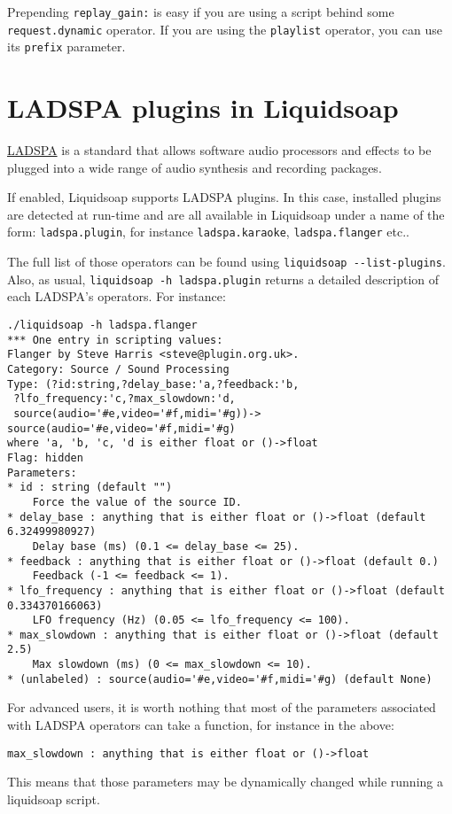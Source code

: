 \documentclass{book}
\begin{document}
Prepending \verb+replay_gain:+ is easy if you are using a script behind some
\verb+request.dynamic+ operator. If you are using the \verb+playlist+ operator,
you can use its \verb+prefix+ parameter.


\section{LADSPA plugins in Liquidsoap}
\href{http://www.ladspa.org/}{LADSPA} is a standard that allows software audio
processors and effects to be plugged into a wide range of audio synthesis and
recording packages.

If enabled, Liquidsoap supports LADSPA plugins. In this case, installed plugins
are detected at run-time and are all available in Liquidsoap under a name of the
form: \verb+ladspa.plugin+, for instance \verb+ladspa.karaoke+,
\verb+ladspa.flanger+ etc..

The full list of those operators can be found using
\verb+liquidsoap --list-plugins+.  Also, as usual,
\verb+liquidsoap -h ladspa.plugin+ returns a detailed description of each
LADSPA's operators.  For instance:

\begin{verbatim}
./liquidsoap -h ladspa.flanger
*** One entry in scripting values:
Flanger by Steve Harris <steve@plugin.org.uk>.
Category: Source / Sound Processing
Type: (?id:string,?delay_base:'a,?feedback:'b,
 ?lfo_frequency:'c,?max_slowdown:'d,
 source(audio='#e,video='#f,midi='#g))->
source(audio='#e,video='#f,midi='#g)
where 'a, 'b, 'c, 'd is either float or ()->float
Flag: hidden
Parameters:
* id : string (default "")
    Force the value of the source ID.
* delay_base : anything that is either float or ()->float (default 6.32499980927)
    Delay base (ms) (0.1 <= delay_base <= 25).
* feedback : anything that is either float or ()->float (default 0.)
    Feedback (-1 <= feedback <= 1).
* lfo_frequency : anything that is either float or ()->float (default 0.334370166063)
    LFO frequency (Hz) (0.05 <= lfo_frequency <= 100).
* max_slowdown : anything that is either float or ()->float (default 2.5)
    Max slowdown (ms) (0 <= max_slowdown <= 10).
* (unlabeled) : source(audio='#e,video='#f,midi='#g) (default None)
\end{verbatim}
For advanced users, it is worth nothing that most of the parameters associated
with LADSPA operators can take a function, for instance in the above:
\begin{verbatim}
max_slowdown : anything that is either float or ()->float
\end{verbatim}
This means that those parameters may be dynamically changed while running a
liquidsoap script.
\end{document}
